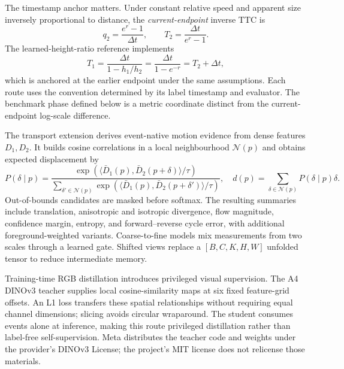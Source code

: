 The timestamp anchor matters. Under constant relative speed and apparent size inversely proportional to distance, the \emph{current-endpoint} inverse TTC is
\begin{equation}
 q_2=\frac{e^r-1}{\Delta t},\qquad T_2=\frac{\Delta t}{e^r-1}.
\label{eq:current-anchor}
\end{equation}
The learned-height-ratio reference implements
\begin{equation}
 T_1=\frac{\Delta t}{1-h_1/h_2}
     =\frac{\Delta t}{1-e^{-r}}=T_2+\Delta t,
\label{eq:start-anchor}
\end{equation}
which is anchored at the earlier endpoint under the same assumptions. Each route uses the convention determined by its label timestamp and evaluator. The benchmark phase defined below is a metric coordinate distinct from the current-endpoint log-scale difference. 

The transport extension derives event-native motion evidence from dense features $D_1,D_2$. It builds cosine correlations in a local neighbourhood $\mathcal N(p)$ and obtains expected displacement by
\begin{equation}
 P(\delta\mid p)=\frac{\exp\!\left(\langle\bar D_1(p),\bar D_2(p+\delta)\rangle/\tau\right)}
 {\sum_{\delta'\in\mathcal N(p)}\exp\!\left(\langle\bar D_1(p),\bar D_2(p+\delta')\rangle/\tau\right)},
 \quad d(p)=\sum_{\delta\in\mathcal N(p)}P(\delta\mid p)\delta.
\end{equation}
Out-of-bounds candidates are masked before softmax. The resulting summaries include translation, anisotropic and isotropic divergence, flow magnitude, confidence margin, entropy, and forward--reverse cycle error, with additional foreground-weighted variants. Coarse-to-fine models mix measurements from two scales through a learned gate. Shifted views replace a $[B,C,K,H,W]$ unfolded tensor to reduce intermediate memory. 

Training-time RGB distillation introduces privileged visual supervision. The A4 DINOv3 teacher \citep{dinov3} supplies local cosine-similarity maps at six fixed feature-grid offsets. An L1 loss transfers these spatial relationships without requiring equal channel dimensions; slicing avoids circular wraparound. The student consumes events alone at inference, making this route privileged distillation rather than label-free self-supervision. Meta distributes the teacher code and weights under the provider's DINOv3 License; the project's MIT license does not relicense those materials. 

